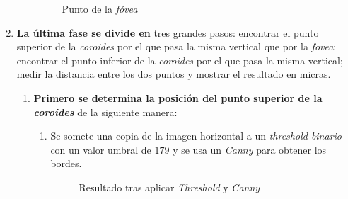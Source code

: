 \begin{enumerate}
\begin{enumerate}[label*=\arabic*.]
      \begin{figure}[H]
        \caption{Punto de la \emph{fóvea}}
        \centering \setlength\fboxsep{0pt} \setlength\fboxrule{0.5pt}
      \end{figure}

  \end{enumerate}
\item \textbf{La última fase se divide en} tres grandes pasos:
  encontrar el punto superior de la \emph{\gls{coroides}} por el que
  pasa la misma vertical que por la \emph{\gls{fovea}}; encontrar el
  punto inferior de la \emph{\gls{coroides}} por el que pasa la misma
  vertical; medir la distancia entre los dos puntos y mostrar el
  resultado en micras.
  \begin{enumerate}[label*=\arabic*.]
  \item \textbf{Primero se determina la posición del punto superior de
      la \emph{\gls{coroides}}} de la siguiente manera:
    \begin{enumerate}[label*=\arabic*.]
    \item Se somete una copia de la imagen horizontal a un
      \emph{threshold binario} con un valor umbral de $179$ y se usa
      un \emph{Canny} para obtener los bordes.

      \begin{figure}[H]
        \caption{Resultado tras aplicar \emph{Threshold} y \emph{Canny}}
        \centering \setlength\fboxsep{0pt} \setlength\fboxrule{0.5pt}
      \end{figure}


\end{enumerate}
\end{enumerate}
\end{enumerate}
